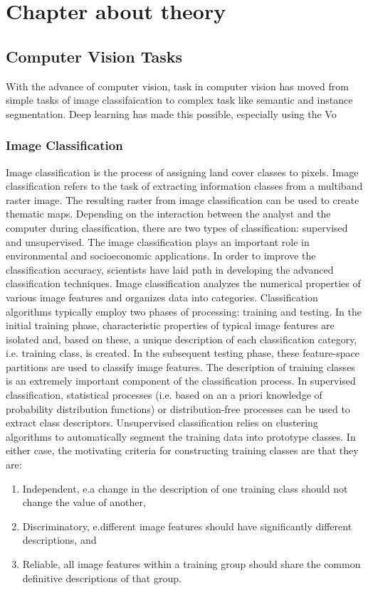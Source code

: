 \chapter{Chapter about theory}\label{ch:THEORY}
\section{Computer Vision Tasks}
With the advance of computer vision, task in computer vision has moved from simple tasks  of image classifaication to complex task like semantic and instance segmentation. Deep learning has made this possible, especially using the Vo
\subsection{Image Classification}
Image classification is the process of assigning land cover classes to pixels. Image classification refers to the task of extracting information classes from a multiband raster image. The resulting raster from image classification can be used to create thematic maps. Depending on the interaction between the analyst and the computer during classification, there are two types of classification: supervised and unsupervised. The image classification plays an important role in environmental and socioeconomic applications. In order to improve the classification accuracy, scientists have laid path in developing the advanced classification techniques.
Image classification analyzes the numerical properties of various image features and organizes data into categories. Classification algorithms typically employ two phases of processing: training and testing. In the initial training phase, characteristic properties of typical image features are isolated and, based on these, a unique description of each classification category, i.e. training class, is created. In the subsequent testing phase, these feature-space partitions are used to classify image features. The description of training classes is an extremely important component of the classification process. In supervised classification, statistical processes (i.e. based on an a priori knowledge of probability distribution functions) or distribution-free processes can be used to extract class descriptors. Unsupervised classification relies on clustering algorithms to automatically segment the training data into prototype classes. In either case, the motivating criteria for constructing training classes are that they are:
\begin{enumerate}
\item Independent, e.a change in the description of one training class should not change the value of another,
\item Discriminatory, e.different image features should have significantly different descriptions, and
\item Reliable, all image features within a training group should share the common definitive descriptions of that group.
\end{enumerate}

